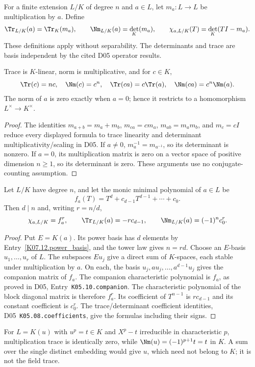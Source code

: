 \begin{definition}
For a finite extension $L/K$ of degree $n$ and $a\in L$, let $m_a:L\to L$ be multiplication by $a$. Define
\[
\Tr_{L/K}(a)=\Tr_K(m_a),\qquad \Nm_{L/K}(a)=\det_K(m_a),\qquad
\chi_{a,L/K}(T)=\det_K(TI-m_a).
\]
These definitions apply without separability. The determinants and trace are basis independent by the cited D05 operator results.
\end{definition}
\begin{proposition}
Trace is $K$-linear, norm is multiplicative, and for $c\in K$,
\[
\Tr(c)=nc,\quad \Nm(c)=c^n,\quad
\Tr(ca)=c\Tr(a),\quad \Nm(ca)=c^n\Nm(a).
\]
The norm of $a$ is zero exactly when $a=0$; hence it restricts to a homomorphism $L^\times\to K^\times$.
\end{proposition}
\begin{proof}
The identities $m_{a+b}=m_a+m_b$, $m_{ca}=c m_a$, $m_{ab}=m_a m_b$, and $m_c=cI$ reduce every displayed formula to trace linearity and determinant multiplicativity/scaling in D05. If $a\ne0$, $m_a^{-1}=m_{a^{-1}}$, so its determinant is nonzero. If $a=0$, its multiplication matrix is zero on a vector space of positive dimension $n\geq1$, so its determinant is zero. These arguments use no conjugate-counting assumption.
\end{proof}

\begin{theorem}
Let $L/K$ have degree $n$, and let the monic minimal polynomial of $a\in L$ be
\[f_a(T)=T^d+c_{d-1}T^{d-1}+\cdots+c_0.\]
Then $d\mid n$ and, writing $r=n/d$,
\[
\chi_{a,L/K}=f_a^r,\qquad \Tr_{L/K}(a)=-r c_{d-1},\qquad
\Nm_{L/K}(a)=(-1)^n c_0^r.
\]
\end{theorem}
\begin{proof}
Put $E=K(a)$. Its power basis has $d$ elements by Entry~\ref{K07.12.power_basis}, and the tower law gives $n=rd$. Choose an $E$-basis $u_1,\ldots,u_r$ of $L$. The subspaces $Eu_j$ give a direct sum of $K$-spaces, each stable under multiplication by $a$. On each, the basis $u_j,au_j,\ldots,a^{d-1}u_j$ gives the companion matrix of $f_a$. The companion characteristic polynomial is $f_a$, as proved in D05, Entry~\texttt{K05.10.companion}. The characteristic polynomial of the block diagonal matrix is therefore $f_a^r$. Its coefficient of $T^{n-1}$ is $r c_{d-1}$ and its constant coefficient is $c_0^r$. The trace/determinant coefficient identities, D05~\texttt{K05.08.coefficients}, give the formulas including their signs.
\end{proof}
\begin{example}
For $L=K(u)$ with $u^p=t\in K$ and $X^p-t$ irreducible in characteristic $p$, multiplication trace is identically zero, while $\Nm(u)=(-1)^{p+1}t=t$ in $K$. A sum over the single distinct embedding would give $u$, which need not belong to $K$; it is not the field trace.
\end{example}


